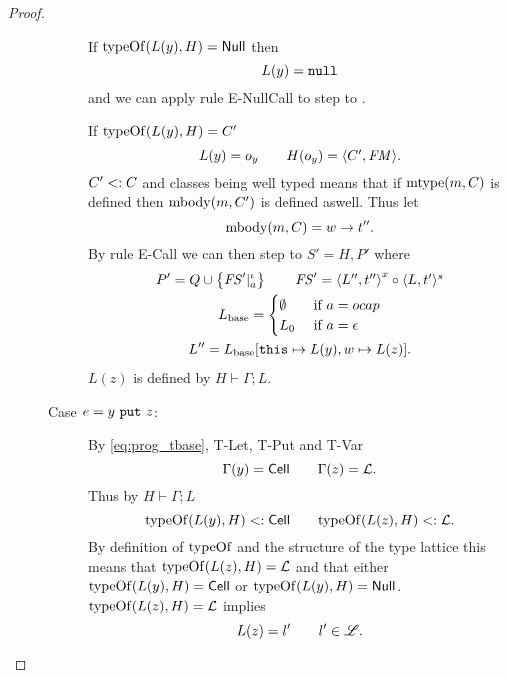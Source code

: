 \begin{proof}
\begin{description}
\begin{description}
          If $\mbox{$\mathrm{typeOf}$}(L(y), H) = \mbox{$\mathsf{Null}$}$ then
          \begin{equation*}
            L(y) = \mbox{\mdseries\texttt{null}}
          \end{equation*}
          and we can apply rule {\sc E-NullCall} to step to \Error.
          \contradiction

          If $\mbox{$\mathrm{typeOf}$}(L(y), H) = C'$
          \begin{equation*}
            L(y) = o_y \quad\quad H(o_y) = \mbox{$\langle C', \mathit{FM} \rangle$}.
          \end{equation*}
          $C' <: C$ and classes being well typed means that if $\mbox{$\mathrm{mtype}$}(m, C)$
          is defined then $\mbox{$\mathrm{mbody}$}(m, C')$ is defined aswell. Thus let
          \begin{equation*}
            \mbox{$\mathrm{mbody}$}(m, C) = w \to t''.
          \end{equation*}
          By rule {\sc E-Call} we can then step to $S' = H, P'$ where
          \begin{equation*}
            \begin{gathered}
              P' = Q \cup \left\{\mathit{FS}'|_a^\iota \right\} \quad\quad \mathit{FS}' = \mbox{$\langle L'',
              t'' \rangle$}^x \circ \mbox{$\langle L, t' \rangle^s$} \\
              L_{\text{base}} =
              \begin{cases}
                \emptyset & \text{ if } a = \mbox{$ocap$} \\
                L_0       & \text{ if } a = \mbox{$\epsilon$}
              \end{cases} \\
              L'' = L_{\text{base}}[\mbox{\mdseries\texttt{this}} \mapsto L(y), w \mapsto L(z)].
            \end{gathered}
          \end{equation*}
          $L(z)$ is defined by $H \vdash \Gamma; L$. \contradiction

        \item[Case $e = \mbox{\mdseries$y$~\texttt{put}~$z$}$:]
          By \eqref{eq:prog_tbase}, {\sc T-Let}, {\sc T-Put} and {\sc T-Var}
          \begin{equation*}
            \Gamma(y) = \mbox{$\mathsf{Cell}$} \quad\quad \Gamma(z) = \mbox{$\mathcal{L}$}.
          \end{equation*}
          Thus by $H \vdash \Gamma; L$
          \begin{equation*}
            \mbox{$\mathrm{typeOf}$}(L(y), H) <: \mbox{$\mathsf{Cell}$} \quad\quad \mbox{$\mathrm{typeOf}$}(L(z), H) <:
            \mbox{$\mathcal{L}$}.
          \end{equation*}
          By definition of $\mbox{$\mathrm{typeOf}$}$ and the structure of the type lattice this
          means that $\mbox{$\mathrm{typeOf}$}(L(z), H) = \mbox{$\mathcal{L}$}$ and that either
          $\mbox{$\mathrm{typeOf}$}(L(y), H) = \mbox{$\mathsf{Cell}$}$ or $\mbox{$\mathrm{typeOf}$}(L(y), H) = \mbox{$\mathsf{Null}$}$. \\
          $\mbox{$\mathrm{typeOf}$}(L(z), H) = \mbox{$\mathcal{L}$}$ implies
          \begin{equation*}
            L(z) = l' \quad\quad l' \in \mbox{$\mathscr{L}$}.
          \end{equation*}


\end{description}
\end{description}
\end{proof}
